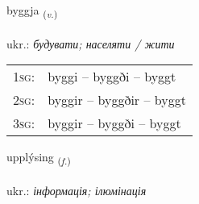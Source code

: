 \documentclass[frontgrid, backgrid]{flacards}\usepackage[]{graphicx}\usepackage[]{xcolor}
\begin{document}
\renewcommand{\blhead}{\vskip5pt {\small\bfseries\footnotesize Sagnorð | дієслово }}
\renewcommand{\bcfoot}{\vskip5pt \hspace{2pt}{\small\bfseries\footnotesize 1K}}


{byggja \small{\textsubscript{(\textit{v.})}} \\[1ex] %
\textphonetic{[pɪca]} \\
ukr.: \emph{будувати; населяти / жити} \\  [2ex]
\renewcommand*{\arraystretch}{0.8}
\begin{tabular}{p{1cm}l}
\textsc{1sg}: & byggi -- byggði -- byggt \\ 
\textsc{2sg}: & byggir -- byggðir -- byggt \\ 
\textsc{3sg}: & byggir -- byggði -- byggt \\ 
\end{tabular}
}

\renewcommand{\flhead}{\vskip5pt \fboxsep=0pt {\small\bfseries\footnotesize Nafnorð | іменник}}
\renewcommand{\fcfoot}{\vskip5pt \fboxsep=0pt \hspace{2pt}{\small\bfseries\footnotesize 1K}}

\renewcommand{\blhead}{\vskip5pt {\small\bfseries\footnotesize Nafnorð | іменник }}
\renewcommand{\bcfoot}{\vskip5pt \hspace{2pt}{\small\bfseries\footnotesize 1K}}


{upplýsing \small{\textsubscript{(\textit{f.})}} \\[1ex] %
\textphonetic{[ʏhplisiŋk]} \\
ukr.: \emph{інформація; ілюмінація} \\  [2ex]
\renewcommand*{\arraystretch}{0.8}
}
\end{document}
